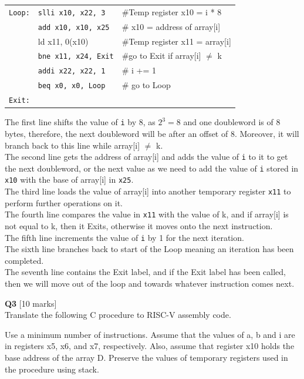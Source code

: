 \documentclass[addpoints]{exam}
\begin{document}
\begin{sloppypar}
\begin{questions}
\begin{solution}
        \begin{tabular}{r l l} 
            \texttt{Loop:} & \texttt{slli x10, x22, 3} & \#Temp register x10 = i * 8 \\ 
            & \texttt{add x10, x10, x25} & \# x10 = address of array[i] \\ 
            & ld x11, 0(x10) & \#Temp register x11 = array[i] \\ 
            & \texttt{bne x11, x24, Exit} & \#go to Exit if array[i] $\neq$ k \\ 
            & \texttt{addi x22, x22, 1} & \# i += 1 \\ 
            & \texttt{beq x0, x0, Loop} & \# go to Loop \\ 
            \texttt{Exit:} & & 
        \end{tabular}

        The first line shifts the value of \texttt{i} by 8, as $ 2^3 = 8 $ and one doubleword is of 8 bytes, therefore, the next doubleword will be after an offset of 8. Moreover, it will branch back to this line while array[i] $\neq$ k. \\ The second line gets the address of array[i] and adds the value of \texttt{i} to it to get the next doubleword, or the next value as we need to add the value of \texttt{i} stored in \texttt{x10} with the base of array[i] in \texttt{x25}. \\ 
        The third line loads the value of array[i] into another temporary register \texttt{x11} to perform further operations on it. \\ 
        The fourth line compares the value in \texttt{x11} with the value of k, and if array[i] is not equal to k, then it Exits, otherwise it moves onto the next instruction. \\ 
        The fifth line increments the value of \texttt{i} by 1 for the next iteration. \\ 
        The sixth line branches back to start of the Loop meaning an iteration has been completed. \\ 
        The seventh line contains the Exit label, and if the Exit label has been called, then we will move out of the loop and towards whatever instruction comes next.
    \end{solution}

    \question[10]\textbf{Q3} [10 marks]
    \\ Translate the following C procedure to RISC-V assembly code. 

    Use a minimum number of instructions. Assume that the values of a, b and i are in registers x5, x6, and x7, respectively. Also, assume that register x10 holds the base address of the array D. Preserve the values of temporary registers used in the procedure using stack. 
    

\end{questions}
\end{sloppypar}
\end{document}

